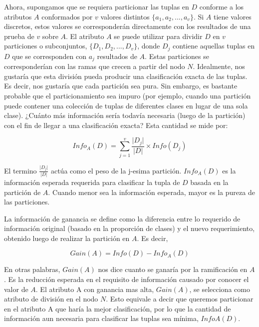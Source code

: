 Ahora, supongamos que se requiera particionar las tuplas en $D$ conforme a los atributos $A$ conformados por $v$ valores distintos $ \{ a_{1},a_{2},...,a_{v} \}$. Si $A$ tiene valores discretos, estos valores se corresponderán directamente con los resultados de una prueba de $v$ sobre $A$. El atributo $A$ se puede utilizar para dividir $D$ en $v$ particiones o subconjuntos, $ \{ D_{1},D_{2},...,D_{v} \}$, donde $D_j$ contiene aquellas tuplas en $D$ que se corresponden con $a_j$ resultados de $A$. Estas particiones se corresponderían con las ramas que crecen a partir del nodo $N$. Idealmente, nos gustaría que esta división pueda producir una clasificación exacta de las tuplas. Es decir, nos gustaría que cada partición sea pura. Sin embargo, es bastante probable que el particionamiento sea impuro (por ejemplo, cuando una partición puede contener una colección de tuplas de diferentes clases en lugar de una sola clase). ¿Cuánto más información sería todavía necesaria (luego de la partición) con el fin de llegar a una clasificación exacta? Esta cantidad se mide por:

\begin{equation}
Info_{A}(D) = \displaystyle\sum_{j=1}^{v} \displaystyle\frac{\lvert D_{j} \rvert}{\lvert D \rvert} \times Info(D_{j})\label{eq3:infoA}
\end{equation}

El termino $\displaystyle\frac{\lvert D_{j} \rvert}{\lvert D \rvert}$ actúa como el peso de la j-esima partición. $Info_{A}(D)$ es la información esperada requerida para clasificar la tupla de $D$ basada en la partición de $A$. Cuando menor sea la información esperada, mayor es la pureza de las particiones.

La información de ganancia se define como la diferencia entre lo requerido de información original (basado en la proporción de clases) y el nuevo requerimiento, obtenido luego de realizar la partición en $A$. Es decir,

\begin{equation}
Gain(A) = Info(D) - Info_{A}(D)\label{eq3:ganancia}
\end{equation}

En otras palabras, $Gain(A)$ nos dice cuanto se ganaría por la ramificación en $A$. Es la reducción esperada en el requisito de información causado por conocer el valor de $A$. El atributo A con ganancia mas alta, $Gain(A)$, se selecciona como atributo de división en el nodo $N$. Esto equivale a decir que queremos particionar en el atributo A que haría la mejor clasificación, por lo que la cantidad de información aun necesaria para clasificar las tuplas sea mínima, $InfoA(D)$.

